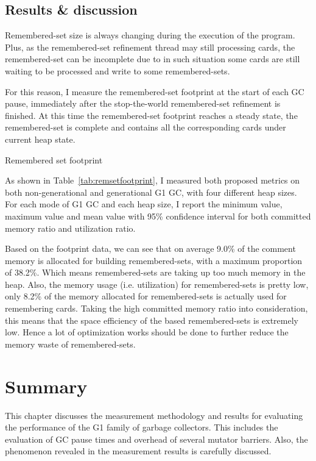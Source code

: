 \subsection{Results \& discussion}

Remembered-set size is always changing during the execution of the program.
Plus, as the remembered-set refinement thread may still processing cards,
the remembered-set can be incomplete due to in such situation some cards are still waiting to
be processed and write to some remembered-sets.

For this reason, I measure the remembered-set footprint at the start of each GC pause, immediately after
the stop-the-world remembered-set refinement is finished. At this time the remembered-set
footprint reaches a steady state, the remembered-set is complete and contains
all the corresponding cards under current heap state.

\begin{table*}
  \centering
  
  \caption{Remembered set footprint}
  \label{tab:remsetfootprint}
\end{table*}

As shown in Table~\ref{tab:remsetfootprint}, I measured both proposed metrics
on both non-generational and generational G1 GC, with four different heap sizes.
For each mode of G1 GC and each heap size, I report the minimum value, maximum value and mean value
with 95\% confidence interval for both committed memory ratio and utilization ratio.

Based on the footprint data, we can see that on average 9.0\% of the comment memory
is allocated for building remembered-sets, with a maximum proportion of 38.2\%.
Which means remembered-sets are taking up too much memory in the heap. 
Also, the memory usage (i.e. utilization) for remembered-sets is pretty low,
only 8.2\% of the memory allocated for remembered-sets is actually used for remembering cards.
Taking the high committed memory ratio into consideration, this means that the
space efficiency of the  based remembered-sets is extremely
low. Hence a lot of optimization works should be done to further reduce the memory
waste of remembered-sets.

\section{Summary} %
\label{sec:summary}

This chapter discusses the measurement methodology and results for evaluating the
performance of the G1 family of garbage collectors. This includes the evaluation of
GC pause times and overhead of several mutator barriers. Also, the phenomenon revealed
in the measurement results is carefully discussed.

